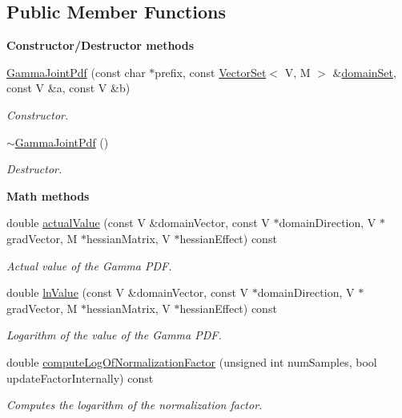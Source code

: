 \subsection*{Public Member Functions}
\begin{Indent}{\bf Constructor/\-Destructor methods}\par
\begin{DoxyCompactItemize}
\item 
\hyperlink{class_q_u_e_s_o_1_1_gamma_joint_pdf_aae9aa55f730ccefa107e1163bdb8e91a}{Gamma\-Joint\-Pdf} (const char $\ast$prefix, const \hyperlink{class_q_u_e_s_o_1_1_vector_set}{Vector\-Set}$<$ V, M $>$ \&\hyperlink{class_q_u_e_s_o_1_1_base_scalar_function_ad0937628825249dd36ded3ce0c7959ac}{domain\-Set}, const V \&a, const V \&b)
\begin{DoxyCompactList}\small\item\em Constructor. \end{DoxyCompactList}\item 
\hyperlink{class_q_u_e_s_o_1_1_gamma_joint_pdf_a457ae0ae5485dce6e68d03fc8153c2ff}{$\sim$\-Gamma\-Joint\-Pdf} ()
\begin{DoxyCompactList}\small\item\em Destructor. \end{DoxyCompactList}\end{DoxyCompactItemize}
\end{Indent}
\begin{Indent}{\bf Math methods}\par
\begin{DoxyCompactItemize}
\item 
double \hyperlink{class_q_u_e_s_o_1_1_gamma_joint_pdf_a4907d38d266d271d34cce9be333a95df}{actual\-Value} (const V \&domain\-Vector, const V $\ast$domain\-Direction, V $\ast$grad\-Vector, M $\ast$hessian\-Matrix, V $\ast$hessian\-Effect) const 
\begin{DoxyCompactList}\small\item\em Actual value of the Gamma P\-D\-F. \end{DoxyCompactList}\item 
double \hyperlink{class_q_u_e_s_o_1_1_gamma_joint_pdf_a990337e7c25a4214b15fd71cb6deb384}{ln\-Value} (const V \&domain\-Vector, const V $\ast$domain\-Direction, V $\ast$grad\-Vector, M $\ast$hessian\-Matrix, V $\ast$hessian\-Effect) const 
\begin{DoxyCompactList}\small\item\em Logarithm of the value of the Gamma P\-D\-F. \end{DoxyCompactList}\item 
double \hyperlink{class_q_u_e_s_o_1_1_gamma_joint_pdf_a5fb1d17a267c8110442689721e74c8d4}{compute\-Log\-Of\-Normalization\-Factor} (unsigned int num\-Samples, bool update\-Factor\-Internally) const 
\begin{DoxyCompactList}\small\item\em Computes the logarithm of the normalization factor. \end{DoxyCompactList}\end{DoxyCompactItemize}
\end{Indent}

